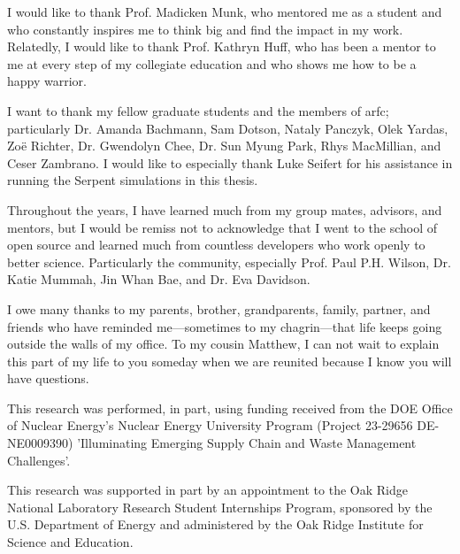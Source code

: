 I would like to thank Prof. Madicken Munk, who mentored me as a student and who
constantly inspires me to think big and find the impact in my work. Relatedly,
I would like to thank Prof. Kathryn Huff, who has been a mentor to me at every
step of my collegiate education and who shows me how to be a happy warrior.

I want to thank my fellow graduate students and the members of
\gls{arfc}; particularly Dr. Amanda Bachmann, Sam Dotson, Nataly Panczyk, Olek
Yardas, Zo\"{e} Richter, Dr. Gwendolyn Chee, Dr. Sun Myung Park, Rhys
MacMillian, and Ceser Zambrano. I would like to especially thank Luke Seifert
for his assistance in running the Serpent simulations in this thesis.

Throughout the years, I have learned much from my group mates, advisors, and
mentors, but I would be remiss not to acknowledge that I went to the school of
open source and learned much from countless developers who work openly to
better science. Particularly the \cyclus community, especially Prof. Paul P.H.
Wilson, Dr. Katie Mummah, Jin Whan Bae, and Dr. Eva Davidson.

I owe many thanks to my parents, brother, grandparents, family, partner, and
friends who have reminded me---sometimes to my chagrin---that life keeps going
outside the walls of my office. To my cousin Matthew, I can not wait to explain
this part of my life to you someday when we are reunited because I know you
will have questions.

This research was performed, in part, using funding received from the DOE
Office of Nuclear Energy's Nuclear Energy University Program (Project 23-29656
DE-NE0009390) 'Illuminating Emerging Supply Chain and Waste Management
Challenges'.

This research was supported in part by an appointment to the Oak Ridge National
Laboratory Research Student Internships Program, sponsored by the U.S.
Department of Energy and administered by the Oak Ridge Institute for Science
and Education.